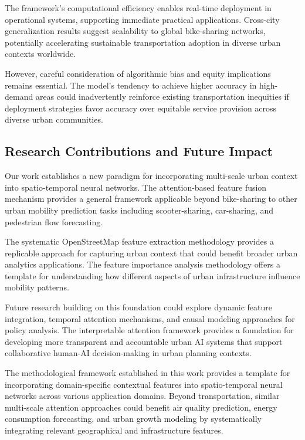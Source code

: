 \documentclass[sigconf,review,nonacm]{acmart}
\begin{document}
The framework's computational efficiency enables real-time deployment in operational systems, supporting immediate practical applications. Cross-city generalization results suggest scalability to global bike-sharing networks, potentially accelerating sustainable transportation adoption in diverse urban contexts worldwide.

However, careful consideration of algorithmic bias and equity implications remains essential. The model's tendency to achieve higher accuracy in high-demand areas could inadvertently reinforce existing transportation inequities if deployment strategies favor accuracy over equitable service provision across diverse urban communities.

\subsection{Research Contributions and Future Impact}

Our work establishes a new paradigm for incorporating multi-scale urban context into spatio-temporal neural networks. The attention-based feature fusion mechanism provides a general framework applicable beyond bike-sharing to other urban mobility prediction tasks including scooter-sharing, car-sharing, and pedestrian flow forecasting.

The systematic OpenStreetMap feature extraction methodology provides a replicable approach for capturing urban context that could benefit broader urban analytics applications. The feature importance analysis methodology offers a template for understanding how different aspects of urban infrastructure influence mobility patterns.

Future research building on this foundation could explore dynamic feature integration, temporal attention mechanisms, and causal modeling approaches for policy analysis. The interpretable attention framework provides a foundation for developing more transparent and accountable urban AI systems that support collaborative human-AI decision-making in urban planning contexts.

The methodological framework established in this work provides a template for incorporating domain-specific contextual features into spatio-temporal neural networks across various application domains. Beyond transportation, similar multi-scale attention approaches could benefit air quality prediction, energy consumption forecasting, and urban growth modeling by systematically integrating relevant geographical and infrastructure features.
\end{document}
